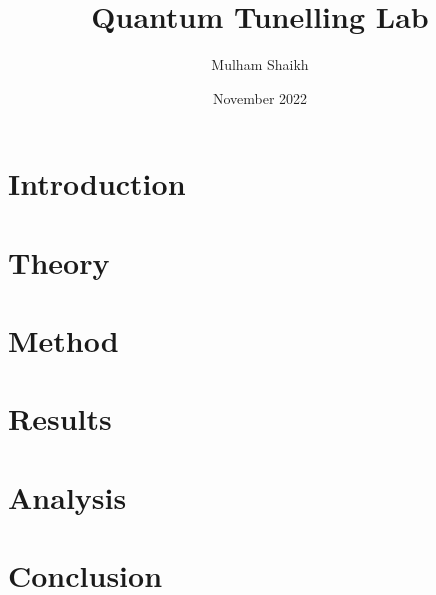 \documentclass{article}
\title{Quantum Tunelling Lab}
\author{Mulham Shaikh}
\date{November 2022}
\begin{document}
\maketitle
\newpage
    \tableofcontents

\newpage
\section{Introduction}
\section{Theory}
\section{Method}
\section{Results}
\section{Analysis}
\section{Conclusion}
\end{document}
